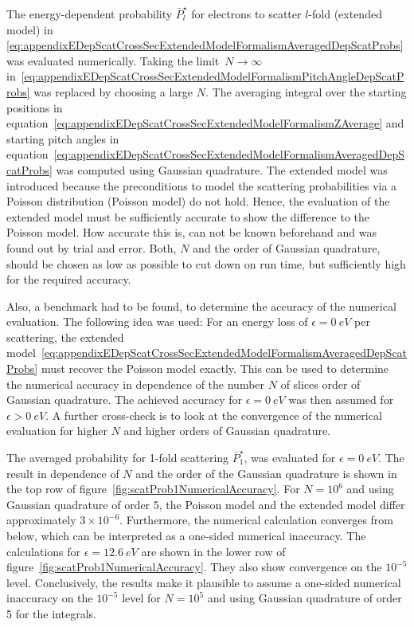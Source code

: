 The energy-dependent probability $\bar{P}^{\star}_l$ for electrons to scatter $l$-fold (extended model) in \eqref{eq:appendixEDepScatCrossSecExtendedModelFormalismAveragedDepScatProbs} was evaluated numerically. Taking the limit~$N\rightarrow\infty$ in~\eqref{eq:appendixEDepScatCrossSecExtendedModelFormalismPitchAngleDepScatProbs} was replaced by choosing a large $N$. The averaging integral over the starting positions in equation~\eqref{eq:appendixEDepScatCrossSecExtendedModelFormalismZAverage} and starting pitch angles in equation~\eqref{eq:appendixEDepScatCrossSecExtendedModelFormalismAveragedDepScatProbs} was computed using Gaussian quadrature. The extended model was introduced because the preconditions to model the scattering probabilities via a Poisson distribution (Poisson model) do not hold. Hence, the evaluation of the extended model must be sufficiently accurate to show the difference to the Poisson model. How accurate this is, can not be known beforehand and was found out by trial and error. Both, $N$ and the order of Gaussian quadrature, should be chosen as low as possible to cut down on run time, but sufficiently high for the required accuracy. 

Also, a benchmark had to be found, to determine the accuracy of the numerical evaluation. The following idea was used: For an energy loss of $\epsilon=\SI{0}{eV}$ per scattering, the extended model~\eqref{eq:appendixEDepScatCrossSecExtendedModelFormalismAveragedDepScatProbs} must recover the Poisson model exactly. This can be used to determine the numerical accuracy in dependence of the number $N$ of slices order of Gaussian quadrature. The achieved accuracy for $\epsilon=\SI{0}{eV}$ was then assumed for $\epsilon>\SI{0}{eV}$. A further cross-check is to look at the convergence of the numerical evaluation for higher $N$ and higher orders of Gaussian quadrature.

The averaged probability for 1-fold scattering $\bar{P}^{\star}_1$, was evaluated for $\epsilon=\SI{0}{eV}$. The result in dependence of $N$ and the order of the Gaussian quadrature is shown in the top row of figure~\ref{fig:scatProb1NumericalAccuracy}. For $N=10^6$ and using Gaussian quadrature of order 5, the Poisson model and the extended model differ approximately $3\times10^{-6}$. Furthermore, the numerical calculation converges from below, which can be interpreted as a one-sided numerical inaccuracy. The calculations for $\epsilon=\SI{12.6}{eV}$ are shown in the lower row of figure~\ref{fig:scatProb1NumericalAccuracy}. They also show convergence on the $10^{-5}$ level. Conclusively, the results make it plausible to assume a one-sided numerical inaccuracy on the $10^{-5}$ level for $N=10^5$ and using Gaussian quadrature of order 5 for the integrals.

